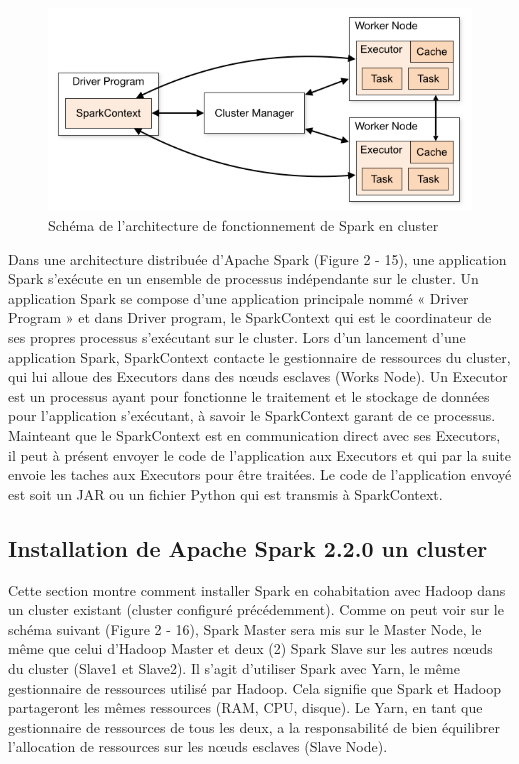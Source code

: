 \documentclass[12pt,english]{book}
\begin{document}
\begin{figure}[h]
	\centering
	\includegraphics[width=\linewidth]{sparkArch}
	\caption[Schéma de l'architecture de fonctionnement de Spark en cluster]{Schéma de l'architecture de fonctionnement de Spark en cluster \footnotemark}
\end{figure}


Dans une architecture distribuée d’Apache Spark (Figure 2 - 15), une application Spark s’exécute en un ensemble de processus indépendante sur le cluster.
Un application Spark se compose d’une application principale nommé « Driver Program » et dans Driver program, le SparkContext qui est le coordinateur de ses propres processus s’exécutant sur le cluster.
Lors d’un lancement d’une application Spark, SparkContext contacte le gestionnaire de ressources du cluster, qui lui alloue des Executors dans des nœuds esclaves (Works Node).
Un Executor est un processus ayant pour fonctionne le traitement et le stockage de données pour l’application s’exécutant, à savoir le SparkContext garant de ce processus.
Mainteant que le SparkContext est en communication direct avec ses Executors, il peut à présent envoyer le code de l’application aux Executors et qui par la suite envoie les taches aux Executors pour être traitées.
Le code de l’application envoyé est soit un JAR ou un fichier Python qui est transmis à SparkContext.


\subsection{Installation de Apache Spark 2.2.0 un cluster}

Cette section montre comment installer Spark en cohabitation avec Hadoop dans un cluster existant (cluster configuré précédemment).
Comme on peut voir sur le schéma suivant (Figure 2 - 16), Spark Master sera mis sur le Master Node, le même que celui d’Hadoop Master et deux (2) Spark Slave sur les autres nœuds du cluster (Slave1 et Slave2).
Il s'agit d'utiliser Spark avec Yarn, le même gestionnaire de ressources utilisé par Hadoop.
Cela signifie que Spark et Hadoop partageront les mêmes ressources (RAM, CPU, disque). Le Yarn, en tant que gestionnaire de ressources de tous les deux, a la responsabilité de bien équilibrer l'allocation de ressources sur les nœuds esclaves (Slave Node).
\end{document}
